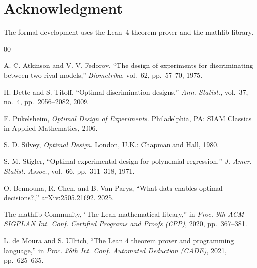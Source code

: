 \documentclass[conference]{IEEEtran}
\theoremstyle{definition}
\begin{document}
\section*{Acknowledgment}

The formal development uses the Lean~4 theorem prover and the mathlib library.

\begin{thebibliography}{00}

 A. C. Atkinson and V. V. Fedorov, ``The design of experiments for
discriminating between two rival models,'' \emph{Biometrika}, vol.~62, pp.~57--70, 1975.

 H. Dette and S. Titoff, ``Optimal discrimination designs,''
\emph{Ann. Statist.}, vol.~37, no.~4, pp.~2056--2082, 2009.

 F. Pukelsheim, \emph{Optimal Design of Experiments}. Philadelphia,
PA: SIAM Classics in Applied Mathematics, 2006.

 S. D. Silvey, \emph{Optimal Design}. London, U.K.: Chapman and Hall,
1980.

 S. M. Stigler, ``Optimal experimental design for polynomial
regression,'' \emph{J. Amer. Statist. Assoc.}, vol.~66, pp.~311--318, 1971.

 O. Bennouna, R. Chen, and B. Van Parys, ``What data enables optimal
decisions?,'' arXiv:2505.21692, 2025.

 The mathlib Community, ``The Lean mathematical library,'' in
\emph{Proc. 9th ACM SIGPLAN Int. Conf. Certified Programs and Proofs (CPP)}, 2020,
pp.~367--381.

 L. de Moura and S. Ullrich, ``The Lean 4 theorem prover and
programming language,'' in \emph{Proc. 28th Int. Conf. Automated Deduction (CADE)}, 2021,
pp.~625--635.

\end{thebibliography}


\end{document}
